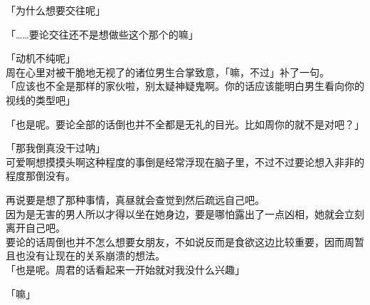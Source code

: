 「为什么想要交往呢」

「……要论交往还不是想做些这个那个的嘛」

「动机不纯呢」\\

周在心里对被干脆地无视了的诸位男生合掌致意，「嘛，不过」补了一句。\\

「应该也不全是那样的家伙啦，别太疑神疑鬼啊。你的话应该能明白男生看向你的视线的类型吧」

「也是呢。要论全部的话倒也并不全都是无礼的目光。比如周你的就不是对吧？」

「那我倒真没干过呐」\\

可爱啊想摸摸头啊这种程度的事倒是经常浮现在脑子里，不过不过要论想入非非的程度那倒没有。

再说要是想了那种事情，真昼就会查觉到然后疏远自己吧。\\

因为是无害的男人所以才得以坐在她身边，要是哪怕露出了一点凶相，她就会立刻离开自己吧。\\

要论的话周倒也并不怎么想要女朋友，不如说反而是食欲这边比较重要，因而周暂且也没有让现在的关系崩溃的想法。\\

「也是呢。周君的话看起来一开始就对我没什么兴趣」

「嘛」

